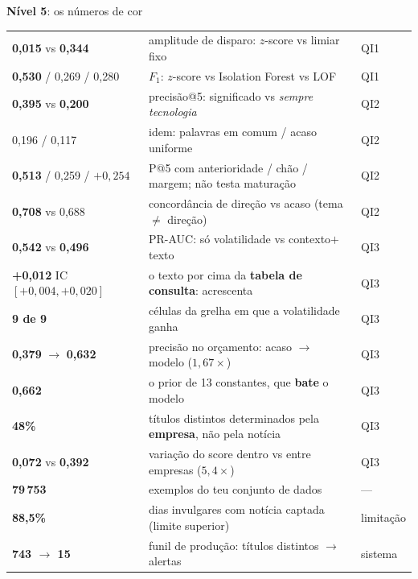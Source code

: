 \documentclass[aspectratio=169]{beamer}
\newcommand{\key}[1]{\textbf{\textcolor{blue!55!black}{#1}}}
\begin{document}
\begin{frame}{\key{Nível 5}: os números de cor}
\centering
\small
\begin{tabular}{lll}
\toprule
\key{0{,}015} vs \key{0{,}344} & amplitude de disparo: $z$-score vs limiar fixo & QI1 \\
\key{0{,}530} / 0{,}269 / 0{,}280 & $F_1$: $z$-score vs Isolation Forest vs LOF & QI1 \\
\key{0{,}395} vs \key{0{,}200} & precisão@5: significado vs \emph{sempre tecnologia} & QI2 \\
0{,}196 / 0{,}117 & idem: palavras em comum / acaso uniforme & QI2 \\
\key{0{,}513} / 0{,}259 / $+0{,}254$ & P@5 com anterioridade / chão / margem; não testa maturação & QI2 \\
\key{0{,}708} vs 0{,}688 & concordância de direção vs acaso (tema $\neq$ direção) & QI2 \\
\key{0{,}542} vs \key{0{,}496} & PR-AUC: só volatilidade vs contexto$+$texto & QI3 \\
\key{+0{,}012} IC $[+0{,}004, +0{,}020]$ & o texto por cima da \textbf{tabela de consulta}: acrescenta & QI3 \\
\key{9 de 9} & células da grelha em que a volatilidade ganha & QI3 \\
\key{0{,}379} $\to$ \key{0{,}632} & precisão no orçamento: acaso $\to$ modelo ($1{,}67\times$) & QI3 \\
\key{0{,}662} & o prior de 13 constantes, que \textbf{bate} o modelo & QI3 \\
\key{48\%} & títulos distintos determinados pela \textbf{empresa}, não pela notícia & QI3 \\
\key{0{,}072} vs \key{0{,}392} & variação do score dentro vs entre empresas ($5{,}4\times$) & QI3 \\
\key{79\,753} & exemplos do teu conjunto de dados & --- \\
\key{88,5\%} & dias invulgares com notícia captada (limite superior) & limitação \\
\key{743 $\to$ 15} & funil de produção: títulos distintos $\to$ alertas & sistema \\
\bottomrule
\end{tabular}
\end{frame}
\end{document}
